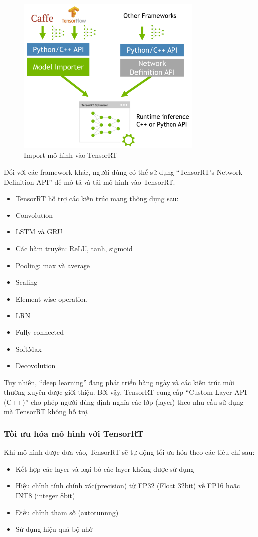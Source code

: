 \documentclass[a4paper]{report}
\begin{document}
\begin{figure}[h!]
	\centering
	\includegraphics[width=0.8\textwidth]{4_2_import.png}
	\caption{Import mô hình vào TensorRT}
\end{figure}


Đối với các framework khác, người dùng có thể sử dụng “TensorRT’s Network Definition API” để mô tả và tải mô hình vào TensorRT.
\begin{itemize}
	\item TensorRT hỗ trợ các kiến trúc mạng thông dụng sau:
	\item Convolution
	\item LSTM và GRU
	\item Các hàm truyền: ReLU, tanh, sigmoid
	\item Pooling: max và average
	\item Scaling
	\item Element wise operation
	\item LRN
	\item Fully-connected
	\item SoftMax
	\item Decovolution
\end{itemize}

Tuy nhiên, “deep learning” đang phát triển hàng ngày và các kiến trúc mới thường xuyên được giới thiệu. Bởi vậy, TensorRT cung cấp “Custom Layer API (C++)” cho phép người dùng định nghĩa các lớp (layer) theo nhu cầu sử dụng mà TensorRT không hỗ trợ.

\subsubsection{Tối ưu hóa mô hình với TensorRT}
Khi mô hình được đưa vào, TensorRT sẽ tự động tối ưu hóa theo các tiêu chí sau:
\begin{itemize}
	\item Kết hợp các layer và loại bỏ các layer không được sử dụng
	\item Hiệu chỉnh tính chính xác(precision) từ FP32 (Float 32bit) về FP16 hoặc INT8 (integer 8bit)
	\item Điều chỉnh tham số (autotunnng)
	\item Sử dụng hiệu quả bộ nhớ
\end{itemize}
\end{document}
